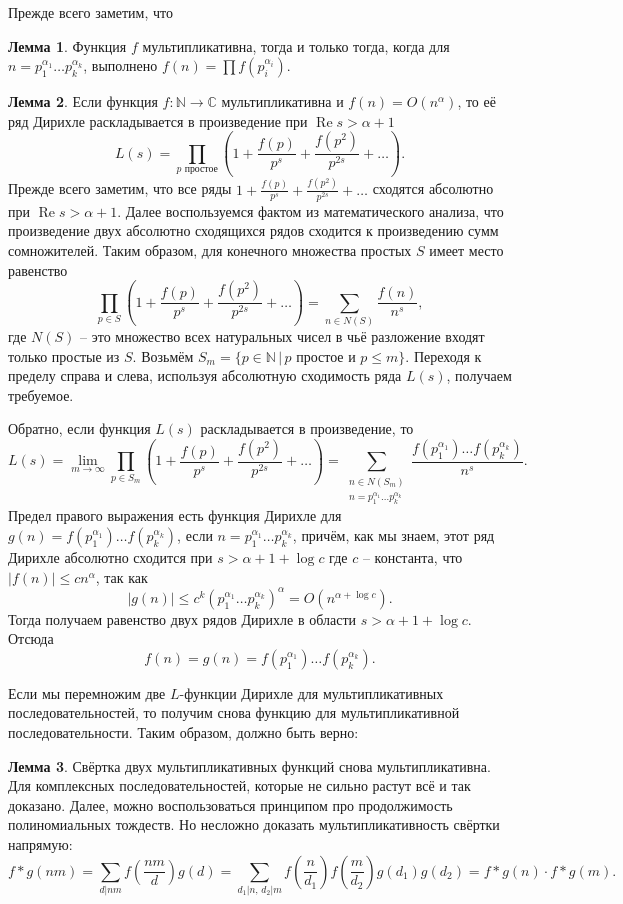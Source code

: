 \documentclass[10pt,a4paper,oneside]{book}
\theoremstyle{definition}
\newtheorem{lem}{{\color{green!50!black} Лемма}}
\renewcommand{\Re}{\operatorname{Re}}
\newcommand{\mb}[1]{\mathbb{#1}}
\def\lm{\begin{lem}}
\def\elm{\end{lem}}
\begin{document}
Прежде всего заметим, что 
\lm Функция $f$ мультипликативна, тогда и только тогда, когда для $n=p_1^{\alpha_1}\dots p_k^{\alpha_k}$, выполнено $f(n)=\prod f(p_i^{\alpha_i})$.
\elm

\lm Если функция $f\colon \mb N \to \mb C$ мультипликативна и $f(n)=O(n^{\alpha})$, то её ряд Дирихле раскладывается в произведение при $\Re s > \alpha+1$
$$L(s)=\prod_{p \text{ простое}} \left(1+\frac{f(p)}{p^s}+\frac{f(p^2)}{p^{2s}}+\dots\right).$$
\proof Прежде всего заметим, что все ряды $1+\frac{f(p)}{p^s}+\frac{f(p^2)}{p^{2s}}+\dots$ сходятся абсолютно при $\Re s>\alpha+1$. Далее воспользуемся фактом из математического анализа, что произведение двух абсолютно сходящихся рядов сходится к произведению сумм сомножителей. Таким образом, для конечного множества простых $S$ имеет место равенство
$$\prod_{p \in S } \left(1+\frac{f(p)}{p^s}+\frac{f(p^2)}{p^{2s}}+\dots\right)=\sum_{n\in N(S)} \frac{f
(n)}{n^s},$$
где $N(S)$ -- это множество всех натуральных чисел в чьё разложение входят только простые из $S$. Возьмём $S_m=\{p\in \mb N \,|\, p \text{ простое и } p\leq m\}$. Переходя к пределу справа и слева, используя абсолютную сходимость ряда $L(s)$, получаем требуемое.

Обратно, если функция $L(s)$ раскладывается в произведение, то 
$$L(s)=\lim_{m\to \infty} \prod_{p \in S_m } \left(1+\frac{f(p)}{p^s}+\frac{f(p^2)}{p^{2s}}+\dots\right)=\sum_{\substack{ n\in N(S_m) \\ n=p_1^{\alpha_1}\dots p_k^{\alpha_k}}}\!\! \frac{f(p_1^{\alpha_1})\dots f(p_k^{\alpha_k})}{n^s}.$$
Предел правого выражения есть функция Дирихле для $g(n)=f(p_1^{\alpha_1})\dots f(p_k^{\alpha_k})$, если $n=p_1^{\alpha_1}\dots p_k^{\alpha_k}$, причём, как мы знаем, этот ряд Дирихле абсолютно сходится при $s>\alpha +1+\log c$ где $c$ -- константа, что $|f(n)|\leq c n^{\alpha}$, так как 
$$|g(n)|\leq c^k(p_1^{\alpha_1}\dots p_k^{\alpha_k})^{\alpha}=O(n^{\alpha+\log c}).$$
Тогда получаем равенство двух рядов Дирихле в области $s>\alpha+1+\log c$. Отсюда $$f(n)=g(n)=f(p_1^{\alpha_1})\dots f(p_k^{\alpha_k}).$$
\endproof
\elm

Если мы перемножим две $L$-функции Дирихле для мультипликативных последовательностей, то получим снова функцию для мультипликативной последовательности. Таким образом, должно быть верно:

\lm Свёртка двух мультипликативных функций снова мультипликативна.
\proof Для комплексных последовательностей, которые не сильно растут всё и так доказано. Далее, можно воспользоваться принципом про продолжимость полиномиальных тождеств. Но несложно доказать мультипликативность свёртки напрямую:
$$f*g(nm)=\sum_{d|nm} f\left(\frac{nm}{d}\right)g(d) = \sum_{d_1 |n, \, d_2|m}f\left(\frac{n}{d_1}\right)f\left(\frac{m}{d_2}\right)g(d_1)g(d_2)= f*g(n)\cdot f*g(m).$$ 
\endproof
\elm
\end{document}
